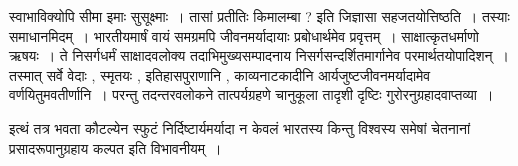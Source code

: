{स्वाभाविक्योपि सीमा इमाः सुसूक्ष्माः~। तासां प्रतीतिः किमालम्बा ?  इति जिज्ञासा सहजतयोत्तिष्ठति~। तस्याः समाधानमिदम्~। भारतीयमार्षं वायं समग्रमपि जीवनमर्यादायाः प्रबोधार्थमेव प्रवृत्तम्~। साक्षात्कृतधर्माणो ऋषयः~। ते निसर्गधर्मं साक्षादवलोक्य तदाभिमुख्यसम्पादनाय निसर्गसन्दर्शितमार्गानेव परमार्थतयोपादिशन्~। तस्मात् सर्वे वेदाः , स्मृतयः , इतिहासपुराणानि , काव्यनाटकादीनि आर्यजुष्टजीवनमर्यादामेव वर्णयितुमवतीर्णानि~। परन्तु तदन्तरवलोकने तात्पर्यग्रहणे चानुकूला तादृशी दृष्टिः गुरोरनुग्रहादवाप्तव्या~। 

इत्थं तत्र भवता कौटल्येन स्फुटं निर्दिष्टार्यमर्यादा न केवलं भारतस्य किन्तु विश्वस्य समेषां चेतनानां प्रसादरूपानुग्रहाय कल्पत इति विभावनीयम्~। 

\articleend
}
